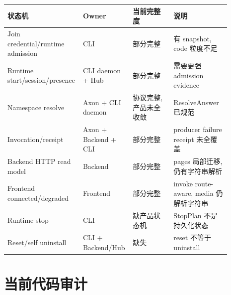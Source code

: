 \documentclass[11pt]{article}
\begin{document}
\begin{longtable}{L{0.26\linewidth} L{0.20\linewidth} L{0.18\linewidth} L{0.25\linewidth}}
\toprule
状态机 & Owner & 当前完整度 & 说明 \\
\midrule
Join credential/runtime admission & CLI & 部分完整 & 有 snapshot, code 粒度不足 \\
Runtime start/session/presence & CLI daemon + Hub & 部分完整 & 需要更强 admission evidence \\
Namespace resolve & Axon + CLI daemon & 协议完整, 产品未全收敛 & ResolveAnswer 已规范 \\
Invocation/receipt & Axon + Backend + CLI & 部分完整 & producer failure receipt 未全覆盖 \\
Backend HTTP read model & Backend & 部分完整 & pages 局部迁移, 仍有字符串解析 \\
Frontend connected/degraded & Frontend & 部分完整 & invoke route-aware, media 仍解析字符串 \\
Runtime stop & CLI & 缺产品状态机 & StopPlan 不是持久化状态 \\
Reset/self uninstall & CLI + Backend/Hub & 缺失 & reset 不等于 uninstall \\
\bottomrule
\end{longtable}

\section{当前代码审计}
\end{document}
